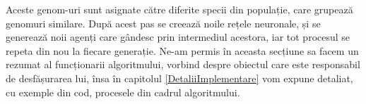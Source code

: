 Aceste genom-uri sunt asignate către diferite specii din populație, care grupează genomuri similare. După acest pas se creează noile rețele neuronale, și se generează noii agenți care gândesc prin intermediul  acestora, iar tot procesul se repeta din nou la fiecare generație.
Ne-am permis în aceasta secțiune sa facem un rezumat al funcționarii algoritmului, vorbind despre obiectul care este responsabil de desfășurarea lui, însa în capitolul \ref{DetaliiImplementare} vom expune detaliat, cu exemple din cod, procesele din cadrul algoritmului.
